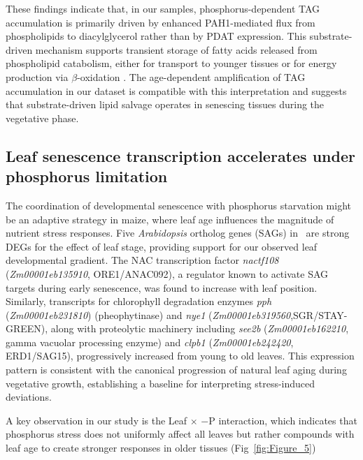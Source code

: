 \documentclass[9pt,twocolumn,twoside]{rilabRxiv}
\begin{document}
These findings indicate that, in our samples, phosphorus-dependent TAG accumulation is primarily driven by enhanced PAH1-mediated flux from phospholipids to diacylglycerol rather than by PDAT expression.
This substrate-driven mechanism supports transient storage of fatty acids released from phospholipid catabolism, either for transport to younger tissues or for energy production via $\beta$-oxidation \cite{wang2020a}.
The age-dependent amplification of TAG accumulation in our dataset is compatible with this interpretation and suggests that substrate-driven lipid salvage operates in senescing tissues during the vegetative phase.

\subsection{Leaf senescence transcription accelerates under phosphorus limitation}

The coordination of developmental senescence with phosphorus starvation might be an adaptive strategy in maize, where leaf age influences the magnitude of nutrient stress responses. 
Five \textit{Arabidopsis} ortholog genes (SAGs) in~\cite{zhang2014c} are strong DEGs for the effect of leaf stage, providing support for our observed leaf developmental gradient. 
The NAC transcription factor \textit{nactf108} (\textit{Zm00001eb135910}, ORE1/ANAC092), a regulator known to activate SAG targets during early senescence, was found to increase with leaf position. 
Similarly, transcripts for chlorophyll degradation enzymes \textit{pph} (\textit{Zm00001eb231810}) (pheophytinase) and \textit{nye1} (\textit{Zm00001eb319560},SGR/STAY-GREEN), along with proteolytic machinery including \textit{see2b} (\textit{Zm00001eb162210}, gamma vacuolar processing enzyme) and \textit{clpb1} (\textit{Zm00001eb242420}, ERD1/SAG15), progressively increased from young to old leaves. 
This expression pattern is consistent with the canonical progression of natural leaf aging during vegetative growth, establishing a baseline for interpreting stress-induced deviations.

A key observation in our study is the Leaf $\times$ $-$P interaction, which indicates that phosphorus stress does not uniformly affect all leaves but rather compounds with leaf age to create stronger responses in older tissues (Fig~\ref{fig:Figure_5})  
\end{document}
